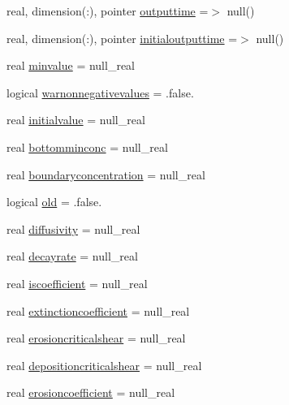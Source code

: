 \begin{DoxyCompactItemize}
real, dimension(\+:), pointer \mbox{\hyperlink{structmodulereservoirs_1_1t__property_a701e9a0e76dfc93eab46369e48e04ed0}{outputtime}} =$>$ null()
\item 
real, dimension(\+:), pointer \mbox{\hyperlink{structmodulereservoirs_1_1t__property_a15ee623ca8ef96d0c55592402825132a}{initialoutputtime}} =$>$ null()
\item 
real \mbox{\hyperlink{structmodulereservoirs_1_1t__property_aa8b632b9e8ff7e04c57c148a427242c2}{minvalue}} = null\+\_\+real
\item 
logical \mbox{\hyperlink{structmodulereservoirs_1_1t__property_af76238b27eaab47c00ad988fd2566509}{warnonnegativevalues}} = .false.
\item 
real \mbox{\hyperlink{structmodulereservoirs_1_1t__property_abf1284f689926da196651caa878afeaa}{initialvalue}} = null\+\_\+real
\item 
real \mbox{\hyperlink{structmodulereservoirs_1_1t__property_aae9be51c80cc8d5f21868ba54d65917e}{bottomminconc}} = null\+\_\+real
\item 
real \mbox{\hyperlink{structmodulereservoirs_1_1t__property_adacb8670f7680414e8c4d2a53ceaa689}{boundaryconcentration}} = null\+\_\+real
\item 
logical \mbox{\hyperlink{structmodulereservoirs_1_1t__property_aac2f2416a6537a1f8bf59f6534256dbc}{old}} = .false.
\item 
real \mbox{\hyperlink{structmodulereservoirs_1_1t__property_ae21b3e1600211009218f05031c31735d}{diffusivity}} = null\+\_\+real
\item 
real \mbox{\hyperlink{structmodulereservoirs_1_1t__property_a74743fbb044b372bcd606233b345317d}{decayrate}} = null\+\_\+real
\item 
real \mbox{\hyperlink{structmodulereservoirs_1_1t__property_a41d097137a6f463e4835c3dfb7166613}{iscoefficient}} = null\+\_\+real
\item 
real \mbox{\hyperlink{structmodulereservoirs_1_1t__property_af73f929a6ef6bcdb47eaadeb94de2aae}{extinctioncoefficient}} = null\+\_\+real
\item 
real \mbox{\hyperlink{structmodulereservoirs_1_1t__property_a03f37438e0cb83ce9afdaa19ab3a79e8}{erosioncriticalshear}} = null\+\_\+real
\item 
real \mbox{\hyperlink{structmodulereservoirs_1_1t__property_af309382f2b3380a36439eb49740e1662}{depositioncriticalshear}} = null\+\_\+real
\item 
real \mbox{\hyperlink{structmodulereservoirs_1_1t__property_ab507e4ac6e347af822d1d6c24ae76299}{erosioncoefficient}} = null\+\_\+real

\end{DoxyCompactItemize}

